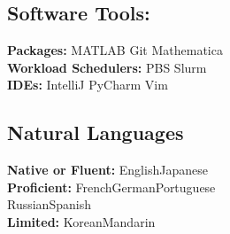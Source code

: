 \documentclass[letterpaper]{deedy-resume} %
\begin{document}
\begin{minipage}[t]{0.32\textwidth}
\sectionspace

\subsection{Software Tools:}
\textbf{Packages:}	MATLAB\textbullet{} Git \textbullet{} Mathematica\\
\textbf{Workload Schedulers:}	 PBS \textbullet{} Slurm\\
\textbf{IDEs:}		IntelliJ \textbullet{} PyCharm \textbullet{} Vim

\sectionspace

\subsection{Natural Languages}
\textbf{Native or Fluent:}	English\textbullet{}Japanese\\
\textbf{Proficient:}	French\textbullet{}German\textbullet{}Portuguese\\
Russian\textbullet{}Spanish\\
\textbf{Limited:}		Korean\textbullet{}Mandarin




\end{minipage} %
%
%
\vspace{0pt}
\end{document}
